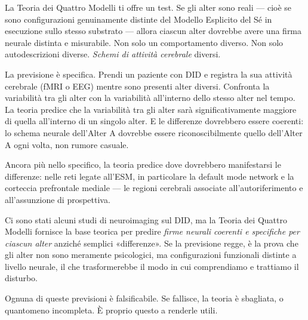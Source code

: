 \documentclass[11pt, twoside, openright]{book}
\begin{document}
La Teoria dei Quattro Modelli ti offre un test. Se gli alter sono reali --- cioè se sono configurazioni genuinamente distinte del Modello Esplicito del Sé in esecuzione sullo stesso substrato --- allora ciascun alter dovrebbe avere una firma neurale distinta e misurabile. Non solo un comportamento diverso. Non solo autodescrizioni diverse. \textit{Schemi di attività cerebrale} diversi.

La previsione è specifica. Prendi un paziente con DID e registra la sua attività cerebrale (fMRI o EEG) mentre sono presenti alter diversi. Confronta la variabilità tra gli alter con la variabilità all'interno dello stesso alter nel tempo. La teoria predice che la variabilità tra gli alter sarà significativamente maggiore di quella all'interno di un singolo alter. E le differenze dovrebbero essere coerenti: lo schema neurale dell'Alter A dovrebbe essere riconoscibilmente quello dell'Alter A ogni volta, non rumore casuale.

Ancora più nello specifico, la teoria predice dove dovrebbero manifestarsi le differenze: nelle reti legate all'ESM, in particolare la default mode network e la corteccia prefrontale mediale --- le regioni cerebrali associate all'autoriferimento e all'assunzione di prospettiva.

Ci sono stati alcuni studi di neuroimaging sul DID, ma la Teoria dei Quattro Modelli fornisce la base teorica per predire \textit{firme neurali coerenti e specifiche per ciascun alter} anziché semplici «differenze». Se la previsione regge, è la prova che gli alter non sono meramente psicologici, ma configurazioni funzionali distinte a livello neurale, il che trasformerebbe il modo in cui comprendiamo e trattiamo il disturbo.

Ognuna di queste previsioni è falsificabile. Se fallisce, la teoria è sbagliata, o quantomeno incompleta. È proprio questo a renderle utili.
\end{document}
